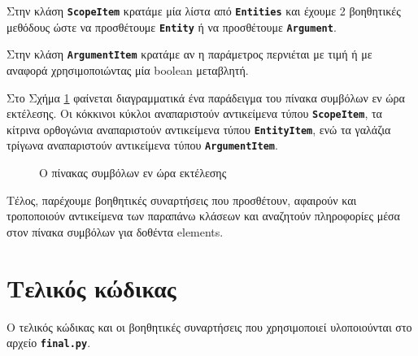 \documentclass[a4paper]{article}
\let\OldTexttt\texttt
\renewcommand{\texttt}[1]{\OldTexttt{\textbf{#1}}}
\begin{document}
Στην κλάση \texttt{ScopeItem} κρατάμε μία λίστα από \texttt{Entities} και
έχουμε 2 βοηθητικές μεθόδους ώστε να προσθέτουμε \texttt{Entity} ή να
προσθέτουμε \texttt{Argument}.

Στην κλάση \texttt{ArgumentItem}  κρατάμε αν η παράμετρος περνιέται με τιμή
ή με αναφορά χρησιμοποιώντας μία boolean μεταβλητή.

Στο Σχήμα \ref{figure:symbol} φαίνεται διαγραμματικά ένα παράδειγμα του
πίνακα συμβόλων εν ώρα εκτέλεσης. Οι κόκκινοι κύκλοι αναπαριστούν
αντικείμενα τύπου \texttt{ScopeItem}, τα κίτρινα ορθογώνια αναπαριστούν
αντικείμενα τύπου \texttt{EntityItem}, ενώ τα γαλάζια τρίγωνα αναπαριστούν
αντικείμενα τύπου \texttt{Argu\-mentItem}. 
\begin{figure}[!htpb]
    \caption{Ο πίνακας συμβόλων εν ώρα εκτέλεσης}
    \label{figure:symbol}
\end{figure}

Τέλος, παρέχουμε βοηθητικές συναρτήσεις που προσθέτουν, αφαιρούν και
τροποποιούν αντικείμενα των παραπάνω κλάσεων και αναζητούν πληροφορίες μέσα
στον πίνακα συμβόλων για δοθέντα elements.

\section{Τελικός κώδικας}
Ο τελικός κώδικας και οι βοηθητικές συναρτήσεις που χρησιμοποιεί
υλοποιούνται στο αρχείο \texttt{final.py}.
\end{document}
